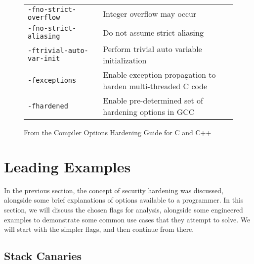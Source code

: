 \begin{figure}[ht]
\begin{longtable}[c]{p{} | p{}}
        \texttt{-fno-strict-overflow} & Integer overflow may occur\\
        \texttt{-fno-strict-aliasing} & Do not assume strict aliasing\\
        \texttt{-ftrivial-auto-var-init} & Perform trivial auto variable initialization\\
        \texttt{-fexceptions} & Enable exception propagation to harden multi-threaded C code\\
        \texttt{-fhardened} & Enable pre-determined set of hardening options in GCC\\
    \end{longtable}
    \caption{From the Compiler Options Hardening Guide for C and C++}
    \label{fig:hardening-options}
\end{figure}
        


\section{Leading Examples}

In the previous section, the concept of security hardening was discussed, alongside some brief explanations of options available to a programmer. 
In this section, we will discuss the chosen flags for analysis, alongside some engineered examples to demonstrate some common use cases that they attempt to solve. 
We will start with the simpler flags, and then continue from there. 

\subsection{Stack Canaries}

